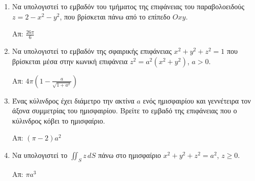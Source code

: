 \begin{enumerate}
\item Να υπολογιστεί το εμβαδόν του τμήματος της επιφάνειας του παραβολοειδούς $z=2-x^{2}-y^{2}$, που βρίσκεται πάνω από το επίπεδο $Oxy$.

\hfill Απ: $\frac{26\pi}{6}$

\item Να υπολογιστεί το εμβαδόν της σφαιρικής επιφάνειας $x^{2}+y^{2}+z^{2}=1$ που βρίσκεται μέσα στην κωνική επιφάνεια $z^{2}=a^{2}(x^{2}+y^{2})$, $a>0$.

\hfill Απ: $4\pi\left(1-\frac{a}{\sqrt{1+a^{2}}}\right)$

\item Ένας κύλινδρος έχει διάμετρο την ακτίνα $a$ ενός ημισφαιρίου και γεννέτειρα τον άξονα συμμετρίας του ημισφαιρίου. Βρείτε το εμβαδό της επιφάνειας που ο κύλινδρος κόβει το ημισφαίριο.

\hfill Απ: $(\pi-2)a^{2}$

\item Να υπολογιστεί το $\iint_{S}z\,dS$ πάνω στο ημισφαίριο $x^{2}+y^{2}+z^{2}=a^{2}$, $z\geq 0$.

\hfill Απ: $\pi a^{3}$

\end{enumerate}



